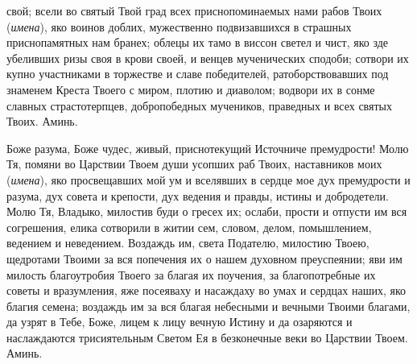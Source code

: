 \begin{mymulticols}
свой; всели во святый Твой град всех приснопоминаемых нами рабов Твоих ({\itshape имена}), яко воинов доблих, мужественно подвизавшихся в страшных приснопамятных нам бранех; облецы их тамо в виссон светел и чист, яко зде убеливших ризы своя в крови своей, и венцев мученических сподоби; сотвори их купно участниками в торжестве и славе победителей, ратоборствовавших под знаменем Креста Твоего с миром, плотию и диаволом; водвори их в сонме славных страстотерпцев, добропобедных мучеников, праведных и всех святых Твоих. Аминь. 

\end{mymulticols}

\mychapterending


\begin{mymulticols}
 


Боже разума, Боже чудес, живый, приснотекущий Источниче премудрости! Молю Тя, помяни во Царствии Твоем души усопших раб Твоих, наставников моих ({\itshape имена}), яко просвещавших мой ум и вселявших в сердце мое дух премудрости и разума, дух совета и крепости, дух ведения и правды, истины и добродетели. Молю Тя, Владыко, милостив буди о гресех их; ослаби, прости и отпусти им вся согрешения, елика сотворили в житии сем, словом, делом, помышлением, ведением и неведением. Воздаждь им, света Подателю, милостию Твоею, щедротами Твоими за вся попечения их о нашем духовном преуспеянии; яви им милость благоутробия Твоего за благая их поучения, за благопотребные их советы и вразумления, яже посеяваху и насаждаху во умах и сердцах наших, яко благия семена; воздаждь им за вся благая небесными и вечными Твоими благами, да узрят в Тебе, Боже, лицем к лицу вечную Истину и да озаряются и наслаждаются трисиятельным Светом Ея в безконечные веки во Царствии Твоем. Аминь. 

\end{mymulticols}

\mychapterending


